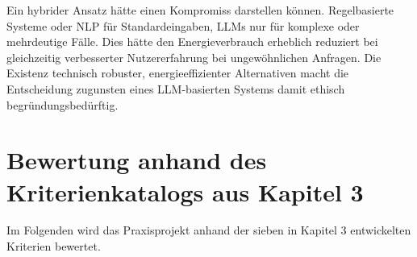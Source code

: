 Ein hybrider Ansatz hätte einen Kompromiss darstellen können. Regelbasierte Systeme oder NLP für Standardeingaben, LLMs nur für komplexe oder mehrdeutige Fälle. Dies hätte den Energieverbrauch erheblich reduziert bei gleichzeitig verbesserter Nutzererfahrung bei ungewöhnlichen Anfragen. Die Existenz technisch robuster, energieeffizienter Alternativen macht die Entscheidung zugunsten eines LLM-basierten Systems damit ethisch begründungsbedürftig.

\section{Bewertung anhand des Kriterienkatalogs aus Kapitel 3}

Im Folgenden wird das Praxisprojekt anhand der sieben in Kapitel 3 entwickelten Kriterien bewertet.

